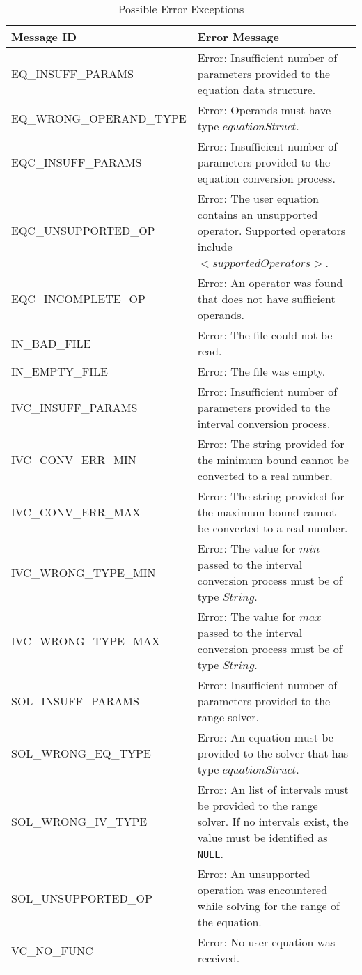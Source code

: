 \documentclass[12pt, titlepage]{article}
\begin{document}
\begin{longtable}{l p{9.5cm}}
	\caption{Possible Error Exceptions} \\
	\toprule
	\textbf{Message ID} & \textbf{Error Message} \\
	\midrule
	EQ\_INSUFF\_PARAMS & Error: Insufficient number of parameters provided to 
	the	equation data structure.\\
	EQ\_WRONG\_OPERAND\_TYPE & Error: Operands must have type 
	$equationStruct$.\\
	EQC\_INSUFF\_PARAMS & Error: Insufficient number of parameters provided to 
	the equation conversion process. \\
	EQC\_UNSUPPORTED\_OP & Error: The user equation contains an unsupported 
	operator. Supported operators include $<supportedOperators>$.\\
	EQC\_INCOMPLETE\_OP & Error: An operator was found that does not have 
	sufficient operands. \\
	IN\_BAD\_FILE & Error: The file could not be read. \\
	IN\_EMPTY\_FILE & Error: The file was empty. \\
	IVC\_INSUFF\_PARAMS & Error: Insufficient number of parameters provided to 
	the interval conversion process. \\
	IVC\_CONV\_ERR\_MIN & Error: The string provided for the minimum bound 
	cannot be converted to a real number. \\
	IVC\_CONV\_ERR\_MAX & Error: The string provided for the maximum bound 
	cannot be converted to a real number.\\
	IVC\_WRONG\_TYPE\_MIN & Error: The value for $min$ passed to the interval 
	conversion process must be of type $String$. \\
	IVC\_WRONG\_TYPE\_MAX & Error: The value for $max$ passed to the interval 
	conversion process must be of type $String$.\\
	SOL\_INSUFF\_PARAMS & Error: Insufficient number of parameters provided to 
	the range solver.\\
	SOL\_WRONG\_EQ\_TYPE & Error: An equation must be provided to the solver 
	that has type $equationStruct$.\\
	SOL\_WRONG\_IV\_TYPE & Error: An list of intervals must be provided to the 
	range solver. If no intervals exist, the value must be identified as 
	\texttt{NULL}.\\
	SOL\_UNSUPPORTED\_OP & Error: An unsupported operation was encountered 
	while solving for the range of the equation.\\
	VC\_NO\_FUNC & Error: No user equation was received. \\
	\bottomrule
\end{longtable}
\end{document}
